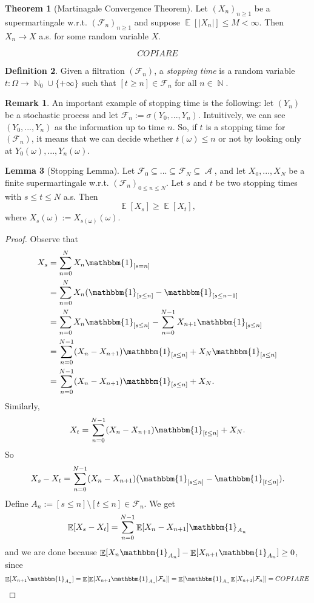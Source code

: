 \documentclass[12pt,a4paper]{report}
\theoremstyle{definition}
\newtheorem{theorem}{Theorem}[chapter] %
\newtheorem{lemma}[theorem]{Lemma}
\newtheorem{definition}[theorem]{Definition}
\newtheorem*{remark}{Remark}
\theoremstyle{num.custom-title}
\DeclareMathOperator{\A}{\mathcal{A}}
\DeclareMathOperator{\E}{\mathbb{E}}
\DeclareMathOperator{\N}{\mathbb{N}}
\DeclareMathOperator{\sm}{\setminus}
\DeclareMathOperator{\sse}{\subseteq}
\newcommand{\F}{\mathcal{F}}
\renewcommand{\1}{\mathbbm{1}}
\begin{document}
\begin{theorem}[Martinagale Convergence Theorem]
	Let $(X_n)_{n \geq 1}$ be a supermartingale w.r.t. $(\F_n)_{n \geq 1}$ and suppose $\E[|X_n|] \leq M < \infty$. Then $X_n \to X$ a.s. for some random variable $X$.
\end{theorem}

\[
COPIARE
\]

\begin{definition}
	Given a filtration $(\F_n)$, a \emph{stopping time} is a random variable $t \colon \Omega \to \N_0 \cup \{+\infty\}$ such that $[t \geq n] \in \F_n$ for all $n \in \N$.
\end{definition}

\begin{remark}
	An important example of stopping time is the following: let $(Y_n)$ be a stochastic process and let $\F_n := \sigma(Y_0,...,Y_n)$. Intuitively, we can see $(Y_0,...,Y_n)$ as the information up to time $n$. So, if $t$ is a stopping time for $(\F_n)$, it means that we can decide whether $t(\omega) \leq n$ or not by looking only at $Y_0(\omega),...,Y_n(\omega)$.
\end{remark}

\begin{lemma}[Stopping Lemma]
	Let $\F_0 \sse ... \sse \F_N \sse \A$, and let $X_0,...,X_N$ be a finite supermartingale w.r.t. $(\F_n)_{0 \leq n \leq N}$. Let $s$ and $t$ be two stopping times with $s \leq t \leq N$ a.s. Then 
	\[
	\E[X_s] \geq \E[X_t],
	\]
	where $X_s(\omega) := X_{s(\omega)}(\omega)$.
\begin{proof}
	Observe that
	\begin{align*}
	X_s 
	&= \sum_{n=0}^N X_n \1_{[s=n]} \\
	&= \sum_{n=0}^N X_n (\1_{[s \leq n]} - \1_{[s \leq n-1]} \\
	&= \sum_{n=0}^N X_n \1_{[s \leq n]} - \sum_{n=0}^{N-1} X_{n+1} \1_{[s \leq n]} \\
	&= \sum_{n=0}^{N-1} (X_n-X_{n+1}) \1_{[s \leq n]} + X_N \1_{[s \leq n]} \\
	&= \sum_{n=0}^{N-1} (X_n-X_{n+1}) \1_{[s \leq n]} + X_N.
	\end{align*}
	Similarly,
	\[
	X_t = \sum_{n=0}^{N-1} (X_n - X_{n+1}) \1_{[t \leq n]} + X_N.
	\]
	So
	\[
	X_s - X_t = \sum_{n=0}^{N-1} (X_n - X_{n+1}) (\1_{[s \leq n]} - \1_{[t \leq n]}).
	\]
	Define $A_n := [s \leq n] \sm [t \leq n] \in \F_n$. We get
	\[
	\E[X_s - X_t] = \sum_{n=0}^{N-1} \E[X_n - X_{n+1}] \1_{A_n}
	\]
	and we are done because $\E[X_n \1_{A_n}] - \E[X_{n+1} \1_{A_n}] \geq 0$, since
	\[
	\E[X_{n+1} \1_{A_n}] = \E[\E[X_{n+1} \1_{A_n} | \F_n]] = \E[\1_{A_n} \E[X_{n+1}|\F_n]] = COPIARE
	\]
\end{proof}
\end{lemma}
\end{document}

